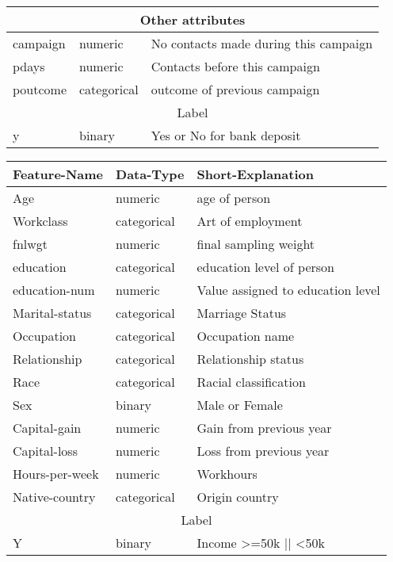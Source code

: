 \documentclass[12pt]{article}
\begin{document}
\begin{sidewaystable}
\begin{minipage}{.5\linewidth}
\begin{tabularx}{\textwidth}{@{}XXX@{}}
            \midrule
            \multicolumn{3}{c}{Other attributes} \\
            \midrule
            campaign & numeric & No contacts made during this campaign \\
            pdays & numeric & Contacts before this campaign \\
            poutcome & categorical & outcome of previous campaign \\
            \midrule
            \multicolumn{3}{c}{Label} \\
            \midrule
            y & binary & Yes or No for bank deposit \\
            \bottomrule
        \end{tabularx}
    \end{minipage}
    \begin{minipage}{.5\linewidth}
        \begin{tabularx}{\textwidth}{@{}XXX@{}}
            \toprule 
            Feature-Name & Data-Type & Short-Explanation \\
            \midrule
            Age & numeric & age of person \\
            Workclass & categorical & Art of employment \\
            fnlwgt & numeric & final sampling weight\\
            education & categorical & education level of person \\
            education-num & numeric & Value assigned to education level \\
            Marital-status & categorical & Marriage Status \\
            Occupation & categorical & Occupation name \\
            Relationship & categorical & Relationship status \\
            Race & categorical & Racial classification \\
            Sex & binary & Male or Female \\
            Capital-gain & numeric & Gain from previous year \\
            Capital-loss & numeric & Loss from previous year \\
            Hours-per-week & numeric & Workhours \\
            Native-country & categorical & Origin country \\
            \midrule
            \multicolumn{3}{c}{Label} \\
            \midrule
            Y & binary & Income >=50k || <50k \\
            \bottomrule
        \end{tabularx}
    \end{minipage}
    \caption[Data Explanation]{Data explanation\protect\footnotemark}
\end{sidewaystable}
\end{document}
